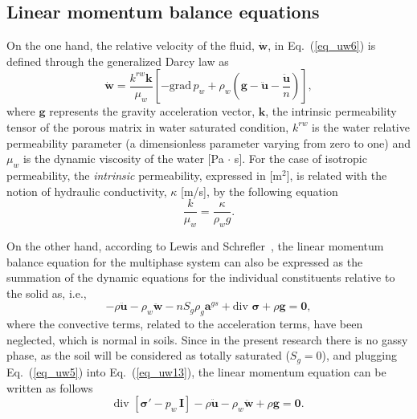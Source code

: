 \documentclass[twocolumn]{svjour3}          %
\begin{document}
\subsection{Linear momentum balance equations}
\label{subsec:22}
On the one hand, the relative velocity of the fluid, %
   $\dot{\boldsymbol{w}}$, in Eq.~(\ref{eq_uw6})  is defined through the generalized Darcy law as~\cite{LewisSchrefler98}
\begin{equation}\label{eq_uw8}
\dot{\boldsymbol{w}}=\frac{k^{rw}\boldsymbol{k}}{\mu_w}\left[ -\mbox{grad} \,p_w + \rho_w(\boldsymbol{g}-\ddot{\boldsymbol{u}}-\frac{\ddot{\boldsymbol{u}}}{n})\right] ,
\end{equation}
where $\boldsymbol{g}$ represents the gravity acceleration vector,  $\boldsymbol{k}$, the intrinsic permeability tensor of the porous matrix in water saturated condition, $k^{rw}$ is the water relative permeability parameter (a dimensionless parameter varying from zero to one) and $\mu_w$ is the dynamic viscosity of the water [Pa $\cdot$ s].  For the case of isotropic permeability,   the {\it intrinsic}  permeability, expressed in  [m$^{2}$], is related with the  notion of  hydraulic conductivity,  $\kappa$ [m/s],  by the following equation
\begin{equation}\label{eq_uw9}
\frac{k}{\mu_w}=\frac{\kappa}{\rho_w g}.
\end{equation}

On the other hand, according to Lewis and Schrefler~\cite{LewisSchrefler98},   the linear momentum balance equation for the multiphase system  can also be expressed as the summation of the dynamic equations for the individual constituents relative to the solid as, i.e.,
\begin{equation}\label{eq_uw13}
-\rho\ddot{\boldsymbol{u}} - \rho_w\ddot{\boldsymbol{w}}-nS_g\rho_g\boldsymbol{a}^{gs}+ \mbox{div } \boldsymbol{\sigma}+\rho\boldsymbol{g}=\boldsymbol{0},
\end{equation}
where the convective terms, related to the acceleration terms, have been neglected, which is normal in soils. Since in the present research there is no gassy phase, as the soil will be considered as totally saturated ($S_g=0$), and plugging Eq.~(\ref{eq_uw5}) into Eq.~(\ref{eq_uw13}), the linear momentum equation can be written as follows
\begin{equation}\label{eq_uw14}
\mbox{div }\left[ \boldsymbol{ \sigma'} - p_{w} \, \textbf{I} \right]-\rho\boldsymbol{\ddot{u}}-\rho_w\boldsymbol{\ddot{w}}+\rho\boldsymbol{g}=\boldsymbol{0}.
\end{equation}
\end{document}
